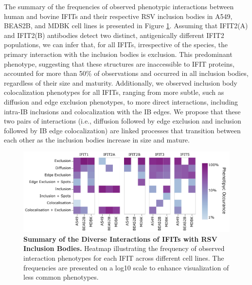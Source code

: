 The summary of the frequencies of observed phenotypic interactions between human and bovine IFITs and their respective RSV inclusion bodies in A549, BEAS2B, and MDBK cell lines is presented in Figure \ref{fig:Summary of the Diverse Interactions of IFITs with RSV Inclusion Bodies}. Assuming that IFIT2(A) and IFIT2(B) antibodies detect two distinct, antigenically different IFIT2 populations, we can infer that, for all IFITs, irrespective of the species, the primary interaction with the inclusion bodies is exclusion. This predominant phenotype, suggesting that these structures are inaccessible to IFIT proteins, accounted for more than 50\% of observations and occurred in all inclusion bodies, regardless of their size and maturity. Additionally, we observed inclusion body colocalization phenotypes for all IFITs, ranging from more subtle, such as diffusion and edge exclusion phenotypes, to more direct interactions, including intra-IB inclusions and colocalization with the IB edges. We propose that these two pairs of interactions (i.e., diffusion followed by edge exclusion and inclusion followed by IB edge colocalization) are linked processes that transition between each other as the inclusion bodies increase in size and mature.

\begin{figure}
    \centering
    \includegraphics[width=1\linewidth]{08. Chapter 3/Figs/heatmap_infection.pdf}
    \caption[Summary of the Diverse Interactions of IFITs with RSV Inclusion Bodies.]{\textbf{Summary of the Diverse Interactions of IFITs with RSV Inclusion Bodies.} Heatmap illustrating the frequency of observed interaction phenotypes for each IFIT across different cell lines. The frequencies are presented on a log10 scale to enhance visualization of less common phenotypes.}
    \label{fig:Summary of the Diverse Interactions of IFITs with RSV Inclusion Bodies}
\end{figure}

